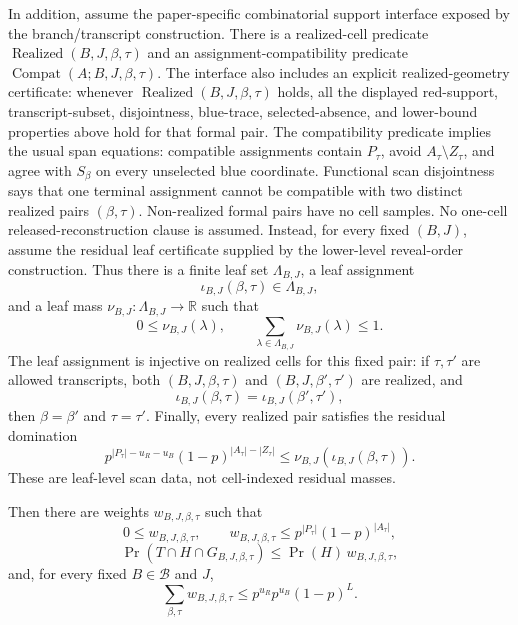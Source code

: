\begin{helper}
In addition, assume the paper-specific combinatorial support interface
exposed by the branch/transcript construction.  There is a realized-cell
predicate \(\operatorname{Realized}(B,J,\beta,\tau)\) and an
assignment-compatibility predicate
\(\operatorname{Compat}(A;B,J,\beta,\tau)\).  The interface also includes an
explicit realized-geometry certificate: whenever
\(\operatorname{Realized}(B,J,\beta,\tau)\) holds, all the displayed
red-support, transcript-subset, disjointness, blue-trace, selected-absence,
and lower-bound properties above hold for that formal pair.  The
compatibility predicate implies the usual span equations: compatible
assignments contain \(P_\tau\), avoid \(A_\tau\setminus Z_\tau\), and agree
with \(S_\beta\) on every unselected blue coordinate.  Functional scan
disjointness says that one terminal assignment cannot be compatible with two
distinct realized pairs \((\beta,\tau)\).  Non-realized formal pairs have no
cell samples.
No one-cell released-reconstruction clause is assumed.  Instead, for every
fixed \((B,J)\), assume the residual leaf certificate supplied by the
lower-level reveal-order construction.  Thus there is a finite leaf set
\(\Lambda_{B,J}\), a leaf assignment
\[
\iota_{B,J}(\beta,\tau)\in\Lambda_{B,J},
\]
and a leaf mass \(\nu_{B,J}:\Lambda_{B,J}\to\mathbb R\) such that
\[
0\le \nu_{B,J}(\lambda),\qquad
\sum_{\lambda\in\Lambda_{B,J}}\nu_{B,J}(\lambda)\le1.
\]
The leaf assignment is injective on realized cells for this fixed pair:
if \(\tau,\tau'\) are allowed transcripts, both
\((B,J,\beta,\tau)\) and \((B,J,\beta',\tau')\) are realized, and
\[
\iota_{B,J}(\beta,\tau)=\iota_{B,J}(\beta',\tau'),
\]
then \(\beta=\beta'\) and \(\tau=\tau'\).  Finally, every realized pair
satisfies the residual domination
\[
p^{|P_\tau|-u_R-u_B}(1-p)^{|A_\tau|-|Z_\tau|}
\le \nu_{B,J}(\iota_{B,J}(\beta,\tau)).
\]
These are leaf-level scan data, not cell-indexed residual masses.

Then there are weights \(w_{B,J,\beta,\tau}\) such that
\[
0\le w_{B,J,\beta,\tau},
\qquad
w_{B,J,\beta,\tau}\le p^{|P_\tau|}(1-p)^{|A_\tau|},
\]
\[
\Pr(T\cap H\cap G_{B,J,\beta,\tau})
\le \Pr(H)\,w_{B,J,\beta,\tau},
\]
and, for every fixed \(B\in{\mathcal B}\) and \(J\),
\[
\sum_{\beta,\tau} w_{B,J,\beta,\tau}
\le p^{u_R}p^{u_B}(1-p)^L .
\]
\end{helper}
